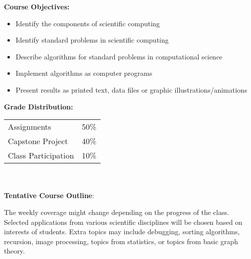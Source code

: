 \documentclass[11pt]{article}
\begin{document}
\textbf {\large Course Objectives:} 
\begin{itemize} \itemsep-0.4em
\item Identify the components of scientific computing
\item Identify standard problems in scientific computing
\item Describe algorithms for standard problems in computational science
\item Implement algorithms as computer programs
\item Present results as printed text, data files or graphic illustrations/animations
\end{itemize}


\textbf {\large Grade Distribution:} \\
\hspace*{40mm}
\begin{tabular}{ l l }
Assignments & 50\% \\
Capstone Project & 40\% \\
Class Participation &10\%
\end{tabular} \\\\


\textbf {\large Tentative Course Outline}:

The weekly coverage might change depending on the progress of the class.  Selected applications from various scientific disciplines will be chosen based on interests of students. Extra topics may include debugging, sorting algorithms, recursion, image processing, topics from statistics, or topics from basic graph theory.
\end{document}

